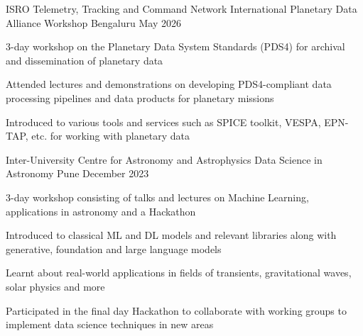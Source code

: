 

\begin{cventries}

    \cventry
    {ISRO Telemetry, Tracking and Command Network} %
    {International Planetary Data Alliance Workshop} %
    {Bengaluru} %
    {May 2026} %
    {
        \begin{cvitems}
        \item 3-day workshop on the Planetary Data System Standards
            (PDS4) for archival and dissemination of planetary data
        \item Attended lectures and demonstrations on developing
            PDS4-compliant data processing pipelines and data
            products for planetary missions
        \item Introduced to various tools and services such as SPICE
            toolkit, VESPA, EPN-TAP, etc. for working with planetary data
        \end{cvitems}
    }

    \cventry
    {Inter-University Centre for Astronomy and Astrophysics} %
    {Data Science in Astronomy} %
    {Pune} %
    {December 2023} %
    {
        \begin{cvitems}
        \item 3-day workshop consisting of talks and lectures on Machine Learning, applications in astronomy and a Hackathon
        \item Introduced to classical ML and DL models and relevant libraries along with generative, foundation and large language models
        \item Learnt about real-world applications in fields of transients, gravitational waves, solar physics and more
        \item Participated in the final day Hackathon to collaborate with working groups to implement data science techniques in new areas
        \end{cvitems}
    }


\end{cventries}
